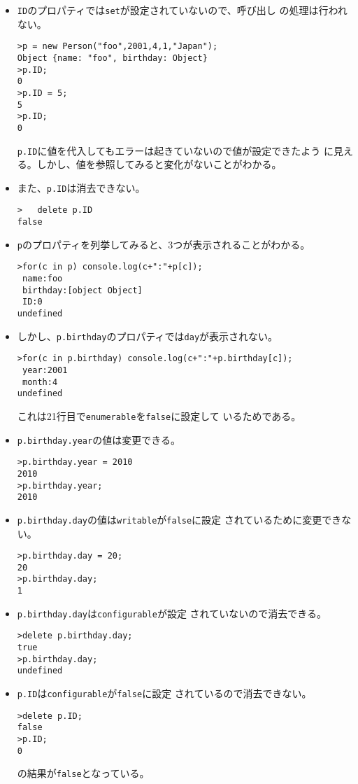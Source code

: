  \begin{itemize}
	\item 
 \texttt{ID}のプロパティでは\texttt{set}が設定されていないので、呼び出し
 の処理は行われない。
\begin{Verbatim}
>p = new Person("foo",2001,4,1,"Japan");
Object {name: "foo", birthday: Object}
>p.ID;
0
>p.ID = 5;
5
>p.ID;
0
\end{Verbatim}
\texttt{p.ID}に値を代入してもエラーは起きていないので値が設定できたよう
に見える。しかし、値を参照してみると変化がないことがわかる。
	\item また、\texttt{p.ID}は消去できない。
\begin{Verbatim}
>	delete p.ID
false
\end{Verbatim}
	\item \texttt{p}のプロパティを列挙してみると、3つが表示されることがわかる。
\begin{Verbatim}
>for(c in p) console.log(c+":"+p[c]);
 name:foo
 birthday:[object Object]
 ID:0
undefined
\end{Verbatim}
	\item しかし、\texttt{p.birthday}のプロパティでは\texttt{day}が表示されない。
\begin{Verbatim}
>for(c in p.birthday) console.log(c+":"+p.birthday[c]);
 year:2001
 month:4
undefined
\end{Verbatim}
これは21行目で\texttt{enumerable}を\texttt{false}に設定して
いるためである。
	\item \texttt{p.birthday.year}の値は変更できる。
\begin{Verbatim}
>p.birthday.year = 2010
2010
>p.birthday.year;
2010
\end{Verbatim}
	\item \texttt{p.birthday.day}の値は\texttt{writable}が\texttt{false}に設定
されているために変更できない。
\begin{Verbatim}
>p.birthday.day = 20;
20
>p.birthday.day;
1
\end{Verbatim}
	\item \texttt{p.birthday.day}は\texttt{configurable}が設定
されていないので消去できる。
\begin{Verbatim}
>delete p.birthday.day;
true
>p.birthday.day;
undefined
\end{Verbatim}
	\item \texttt{p.ID}は\texttt{configurable}が\texttt{false}に設定
されているので消去できない。
\begin{Verbatim}
>delete p.ID;
false
>p.ID;
0
\end{Verbatim}
				 の結果が\texttt{false}となっている。
\end{itemize}
